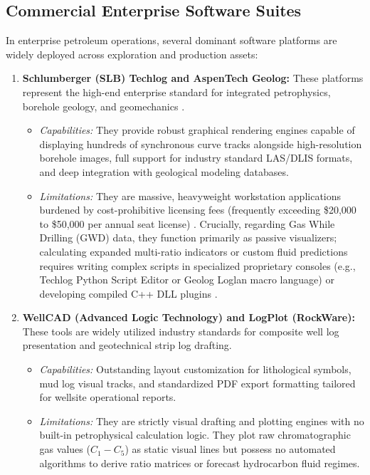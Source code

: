 \subsection{Commercial Enterprise Software Suites}
In enterprise petroleum operations, several dominant software platforms are widely deployed across exploration and production assets:
\begin{enumerate}
    \item \textbf{Schlumberger (SLB) Techlog and AspenTech Geolog:} These platforms represent the high-end enterprise standard for integrated petrophysics, borehole geology, and geomechanics \citep{wood2020}.
    \begin{itemize}
        \item \textit{Capabilities:} They provide robust graphical rendering engines capable of displaying hundreds of synchronous curve tracks alongside high-resolution borehole images, full support for industry standard LAS/DLIS formats, and deep integration with geological modeling databases.
        \item \textit{Limitations:} They are massive, heavyweight workstation applications burdened by cost-prohibitive licensing fees (frequently exceeding \$20,000 to \$50,000 per annual seat license) \citep{wood2020}. Crucially, regarding Gas While Drilling (GWD) data, they function primarily as passive visualizers; calculating expanded multi-ratio indicators or custom fluid predictions requires writing complex scripts in specialized proprietary consoles (e.g., Techlog Python Script Editor or Geolog Loglan macro language) or developing compiled C++ DLL plugins \citep{wood2020}.
    \end{itemize}

    \item \textbf{WellCAD (Advanced Logic Technology) and LogPlot (RockWare):} These tools are widely utilized industry standards for composite well log presentation and geotechnical strip log drafting.
    \begin{itemize}
        \item \textit{Capabilities:} Outstanding layout customization for lithological symbols, mud log visual tracks, and standardized PDF export formatting tailored for wellsite operational reports.
        \item \textit{Limitations:} They are strictly visual drafting and plotting engines with no built-in petrophysical calculation logic. They plot raw chromatographic gas values ($C_1 - C_5$) as static visual lines but possess no automated algorithms to derive ratio matrices or forecast hydrocarbon fluid regimes.
    \end{itemize}
\end{enumerate}

